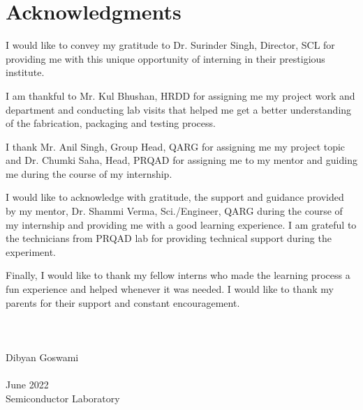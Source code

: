 \cleardoublepage
{}

\chapter*{Acknowledgments}
\vspace{1.0in}
I would like to convey my gratitude to Dr. Surinder Singh, Director, SCL for providing me with this unique opportunity of interning in their prestigious institute.

I am thankful to Mr. Kul Bhushan, HRDD for assigning me my project work and department and conducting lab visits that helped me get a better understanding of the fabrication, packaging and testing process. 

I thank Mr. Anil Singh, Group Head, QARG  for assigning me my project topic and Dr. Chumki Saha, Head, PRQAD for assigning me to my mentor and guiding me during the course of my internship.

I would like to acknowledge with gratitude, the support and guidance provided by my mentor, Dr. Shammi Verma, Sci./Engineer, QARG during the course of my internship and providing me with a good learning experience. I am grateful to the technicians from PRQAD lab for providing technical support during the experiment. 

Finally, I would like to thank my fellow interns who made the learning process a fun experience and helped whenever it was needed. I would like to thank my parents for their support and constant encouragement. 
\\
\\
\\ 
\\
Dibyan Goswami \\ 
\\
June 2022\\
{Semiconductor Laboratory}\\
\newpage
